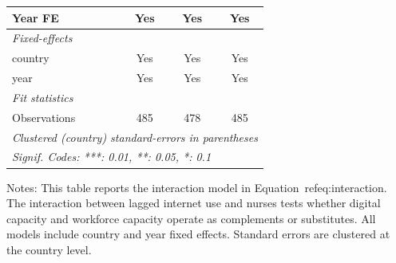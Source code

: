 \begin{table}[htbp]
\begin{tabular}{lccc}
      Year FE                & Yes            & Yes                  & Yes\\  
      \midrule
      \emph{Fixed-effects}\\
      country                & Yes            & Yes                  & Yes\\  
      year                   & Yes            & Yes                  & Yes\\  
      \midrule
      \emph{Fit statistics}\\
      Observations           & 485            & 478                  & 485\\  
      \midrule \midrule
      \multicolumn{4}{l}{\emph{Clustered (country) standard-errors in parentheses}}\\
      \multicolumn{4}{l}{\emph{Signif. Codes: ***: 0.01, **: 0.05, *: 0.1}}\\
   \end{tabular}
\begin{flushleft}
\footnotesize Notes: This table reports the interaction model in Equation~ref{eq:interaction}. The interaction between lagged internet use and nurses tests whether digital capacity and workforce capacity operate as complements or substitutes. All models include country and year fixed effects. Standard errors are clustered at the country level.
\end{flushleft}
\end{table}
